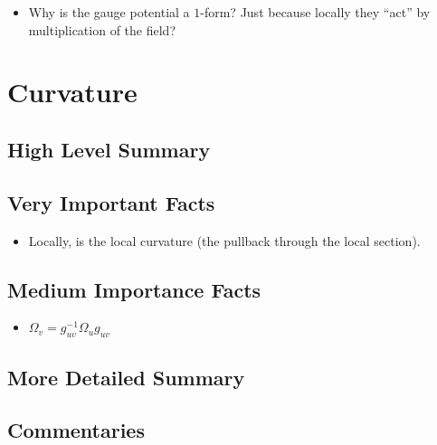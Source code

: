 \documentclass[12pt]{report}
\begin{document}
\begin{itemize}
    \item Why is the gauge potential a $1$-form? Just because locally they ``act'' by multiplication of the field?
\end{itemize}

\chapter{Curvature}
\section{High Level Summary}

\section{Very Important Facts}

\begin{itemize}
    \item Locally,  is the local curvature (the pullback through the local section).
\end{itemize}

\section{Medium Importance Facts}
\begin{itemize}
    \item $\Omega_v = g_{uv}^{-1} \Omega_u g_{uv}$
\end{itemize}
\section{More Detailed Summary}

\section{Commentaries}
\end{document}
